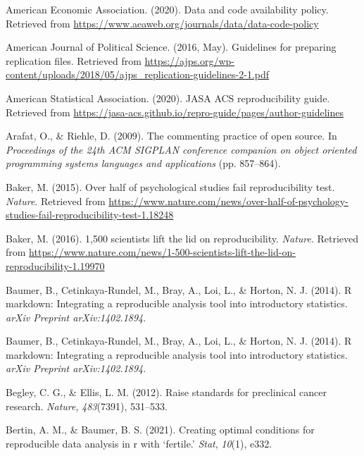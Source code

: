 \documentclass[12pt,twoside]{reedthesis}
\newenvironment{CSLReferences}%
  {}%
  {\par}
\begin{document}
\hypertarget{refs}{}
\begin{CSLReferences}{1}{0}
\leavevmode\hypertarget{ref-aee-policy}{}%
American Economic Association. (2020). Data and code availability policy. Retrieved from \url{https://www.aeaweb.org/journals/data/data-code-policy}

\leavevmode\hypertarget{ref-ajps-guidelines}{}%
American Journal of Political Science. (2016, May). Guidelines for preparing replication files. Retrieved from \url{https://ajps.org/wp-content/uploads/2018/05/ajps_replication-guidelines-2-1.pdf}

\leavevmode\hypertarget{ref-asa-guide}{}%
American Statistical Association. (2020). JASA ACS reproducibility guide. Retrieved from \url{https://jasa-acs.github.io/repro-guide/pages/author-guidelines}

\leavevmode\hypertarget{ref-arafat2009commenting}{}%
Arafat, O., \& Riehle, D. (2009). The commenting practice of open source. In \emph{Proceedings of the 24th ACM SIGPLAN conference companion on object oriented programming systems languages and applications} (pp. 857--864).

\leavevmode\hypertarget{ref-nature-psych}{}%
Baker, M. (2015). Over half of psychological studies fail reproducibility test. \emph{Nature}. Retrieved from \url{https://www.nature.com/news/over-half-of-psychology-studies-fail-reproducibility-test-1.18248}

\leavevmode\hypertarget{ref-nature-crisis}{}%
Baker, M. (2016). 1,500 scientists lift the lid on reproducibility. \emph{Nature}. Retrieved from \url{https://www.nature.com/news/1-500-scientists-lift-the-lid-on-reproducibility-1.19970}

\leavevmode\hypertarget{ref-baumer2014r}{}%
Baumer, B., Cetinkaya-Rundel, M., Bray, A., Loi, L., \& Horton, N. J. (2014). R markdown: Integrating a reproducible analysis tool into introductory statistics. \emph{arXiv Preprint arXiv:1402.1894}.

\leavevmode\hypertarget{ref-baumer2014r}{}%
Baumer, B., Cetinkaya-Rundel, M., Bray, A., Loi, L., \& Horton, N. J. (2014). R markdown: Integrating a reproducible analysis tool into introductory statistics. \emph{arXiv Preprint arXiv:1402.1894}.

\leavevmode\hypertarget{ref-begley2012raise}{}%
Begley, C. G., \& Ellis, L. M. (2012). Raise standards for preclinical cancer research. \emph{Nature}, \emph{483}(7391), 531--533.

\leavevmode\hypertarget{ref-bertin2021creating}{}%
Bertin, A. M., \& Baumer, B. S. (2021). Creating optimal conditions for reproducible data analysis in r with {`fertile.'} \emph{Stat}, \emph{10}(1), e332.


\end{CSLReferences}
\end{document}
